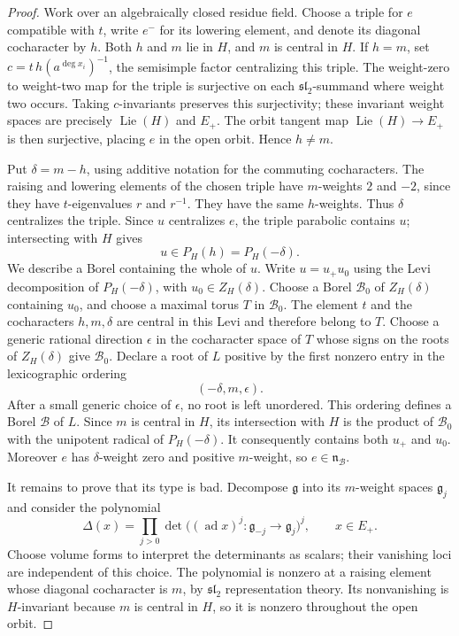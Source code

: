 \documentclass[11pt]{article}
\numberwithin{equation}{section}
\theoremstyle{definition}
\theoremstyle{remark}
\newcommand{\g}{\mathfrak g}
\newcommand{\ad}{\operatorname{ad}}
\newcommand{\Lie}{\operatorname{Lie}}
\begin{document}
\begin{proof}
Work over an algebraically closed residue field.  Choose a triple for
$e$ compatible with $t$, write $e^-$ for its lowering element, and
denote its diagonal cocharacter by $h$.
Both $h$ and $m$ lie in $H$, and $m$ is central in $H$.  If $h=m$, set
$c=t\,h(a^{\deg x_i})^{-1}$, the semisimple factor centralizing this
triple.  The weight-zero to weight-two map for the triple is surjective
on each $\mathfrak{sl}_2$-summand where weight two occurs.  Taking
$c$-invariants preserves this surjectivity; these invariant weight
spaces are precisely $\Lie(H)$ and $E_+$.  The
orbit tangent map $\Lie(H)\to E_+$ is then surjective, placing $e$ in
the open orbit.  Hence $h\ne m$.

Put $\delta=m-h$, using additive notation for the commuting
cocharacters.  The raising and lowering elements of the chosen triple
have $m$-weights $2$ and $-2$, since they have $t$-eigenvalues $r$ and
$r^{-1}$.  They have the same $h$-weights.  Thus $\delta$ centralizes
the triple.  Since $u$ centralizes $e$, the triple parabolic contains
$u$; intersecting with $H$ gives
\[
 u\in P_H(h)=P_H(-\delta).
\]
We describe a Borel containing the whole of $u$.  Write
$u=u_+u_0$ using the Levi decomposition of $P_H(-\delta)$, with
$u_0\in Z_H(\delta)$.  Choose a Borel $\mathcal B_0$ of
$Z_H(\delta)$ containing $u_0$, and choose a maximal torus $T$ in
$\mathcal B_0$.  The element $t$ and the cocharacters $h,m,\delta$
are central in this Levi and therefore belong to $T$.  Choose a generic
rational direction $\epsilon$ in the cocharacter space of $T$ whose
signs on the roots of $Z_H(\delta)$ give $\mathcal B_0$.  Declare a
root of $L$ positive by the first nonzero entry in the lexicographic
ordering
\[
 (-\delta,m,\epsilon).
\]
After a small generic choice of $\epsilon$, no root is left unordered.
This ordering defines a Borel $\mathcal B$ of $L$.  Since $m$ is
central in $H$, its intersection with $H$ is the product of
$\mathcal B_0$ with the unipotent radical of $P_H(-\delta)$.
It consequently contains both $u_+$ and $u_0$.  Moreover $e$ has
$\delta$-weight zero and positive $m$-weight, so
$e\in\mathfrak n_{\mathcal B}$.

It remains to prove that its type is bad.  Decompose $\g$ into its
$m$-weight spaces $\g_j$ and consider the polynomial
\begin{equation}\label{boundary:determinant-polynomial}
 \Delta(x)=\prod_{j>0}
 \det\bigl((\ad x)^j:\g_{-j}\longrightarrow\g_j\bigr)^j,
 \qquad x\in E_+.
\end{equation}
Choose volume forms to interpret the determinants as scalars; their
vanishing loci are independent of this choice.  The polynomial is
nonzero at a raising element whose diagonal cocharacter is $m$, by
$\mathfrak{sl}_2$ representation theory.  Its nonvanishing is
$H$-invariant because $m$ is central in $H$, so it is nonzero throughout
the open orbit.


\end{proof}
\end{document}
